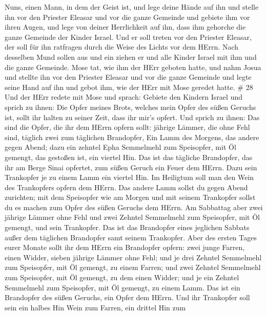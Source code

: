Nuns, einen Mann, in dem der Geist ist, und lege deine Hände auf ihn
 und stelle ihn vor den Priester Eleasar und vor die ganze
Gemeinde und gebiete ihm vor ihren Augen,  und lege von
deiner Herrlichkeit auf ihn, dass ihm gehorche die ganze Gemeinde der
Kinder Israel.  Und er soll treten vor den Priester
Eleasar, der soll für ihn ratfragen durch die Weise des Lichts vor dem
HErrn. Nach desselben Mund sollen aus und ein ziehen er und alle Kinder
Israel mit ihm und die ganze Gemeinde.  Mose tat, wie ihm
der HErr geboten hatte, und nahm Josua und stellte ihn vor den Priester
Eleasar und vor die ganze Gemeinde  und legte seine Hand
auf ihn und gebot ihm, wie der HErr mit Mose geredet hatte. \# 28
 Und der HErr redete mit Mose und sprach: 
Gebiete den Kindern Israel und sprich zu ihnen: Die Opfer meines Brots,
welches mein Opfer des süßen Geruchs ist, sollt ihr halten zu seiner
Zeit, dass ihr mir's opfert.  Und sprich zu ihnen: Das sind
die Opfer, die ihr dem HErrn opfern sollt: jährige Lämmer, die ohne Fehl
sind, täglich zwei zum täglichen Brandopfer,  Ein Lamm des
Morgens, das andere gegen Abend;  dazu ein zehntel Epha
Semmelmehl zum Speisopfer, mit Öl gemengt, das gestoßen ist, ein viertel
Hin.  Das ist das tägliche Brandopfer, das ihr am Berge
Sinai opfertet, zum süßen Geruch ein Feuer dem HErrn.  Dazu
sein Trankopfer je zu einem Lamm ein viertel Hin. Im Heiligtum soll man
den Wein des Trankopfers opfern dem HErrn.  Das andere Lamm
sollst du gegen Abend zurichten; mit dem Speisopfer wie am Morgen und
mit seinem Trankopfer sollst du es machen zum Opfer des süßen Geruchs
dem HErrn.  Am Sabbattag aber zwei jährige Lämmer ohne Fehl
und zwei Zehntel Semmelmehl zum Speisopfer, mit Öl gemengt, und sein
Trankopfer.  Das ist das Brandopfer eines jeglichen Sabbats
außer dem täglichen Brandopfer samt seinem Trankopfer. 
Aber des ersten Tages eurer Monate sollt ihr dem HErrn ein Brandopfer
opfern: zwei junge Farren, einen Widder, sieben jährige Lämmer ohne
Fehl;  und je drei Zehntel Semmelmehl zum Speisopfer, mit
Öl gemengt, zu einem Farren; und zwei Zehntel Semmelmehl zum Speisopfer,
mit Öl gemengt, zu dem einen Widder;  und je ein Zehntel
Semmelmehl zum Speisopfer, mit Öl gemengt, zu einem Lamm. Das ist ein
Brandopfer des süßen Geruchs, ein Opfer dem HErrn.  Und ihr
Trankopfer soll sein ein halbes Hin Wein zum Farren, ein drittel Hin zum
